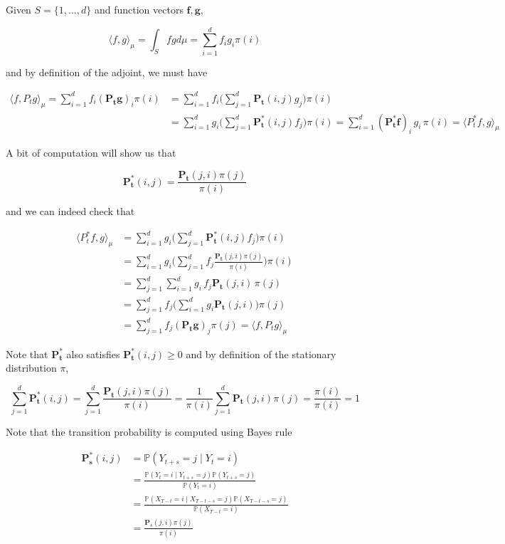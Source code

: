 \documentclass{article}
\begin{document}
      \begin{example}
      Given $S = \{1, \ldots, d\}$ and function vectors $\mathbf{f}, \mathbf{g}$, 

        \[\langle f, g \rangle_\mu = \int_S f g d\mu = \sum_{i=1}^d f_i g_i \pi(i)\]

      and by definition of the adjoint, we must have 

      \begin{align*}
        \langle f, P_t g \rangle_\mu = \sum_{i=1}^d f_i (\mathbf{P_t} \mathbf{g})_i \pi(i) & = \sum_{i=1}^d f_i \bigg( \sum_{j=1}^d \mathbf{P_t}(i, j) g_j \bigg) \pi(i) \\
        & = \sum_{i=1}^d g_i \bigg( \sum_{j=1}^d \mathbf{P_t^*} (i, j) f_j \bigg) \pi(i) = \sum_{i=1}^d (\mathbf{P_t^*} \mathbf{f})_i \, g_i \, \pi(i) = \langle P_t^* f, g \rangle_\mu 
      \end{align*}

      A bit of computation will show us that 

        \[\mathbf{P_t^*}(i, j) = \frac{\mathbf{P_t}(j, i) \pi(j)}{\pi(i)}\]

      and we can indeed check that 

      \begin{align*}
        \langle P_t^* f, g \rangle_\mu  & = \sum_{i=1}^d g_i \bigg( \sum_{j=1}^d \mathbf{P_t^*} (i, j) f_j \bigg) \pi(i) \\
        & = \sum_{i=1}^d g_i \bigg( \sum_{j=1}^d f_j \frac{\mathbf{P_t}(j, i) \pi(j)}{\pi(i)} \bigg) \pi(i) \\
        & = \sum_{j=1}^d \sum_{i=1}^d g_i \, f_j \mathbf{P_t}(j, i) \, \pi(j) \\
        & = \sum_{j=1}^d f_j \bigg( \sum_{i=1}^d g_i \mathbf{P_t}(j, i) \bigg) \pi(j) \\
        & = \sum_{j=1}^d f_j (\mathbf{P_t} \mathbf{g})_j \pi(j) = \langle f, P_t g \rangle_\mu
      \end{align*}

      Note that $\mathbf{P_t^*}$ also satisfies $\mathbf{P_t^*} (i, j) \geq 0$ and by definition of the stationary distribution $\pi$, 

        \[\sum_{j=1}^d \mathbf{P_t^*} (i, j) = \sum_{j=1}^d \frac{\mathbf{P_t}(j, i) \pi(j)}{\pi(i)} = \frac{1}{\pi(i)} \sum_{j=1}^d \mathbf{P_t}(j, i) \pi(j) = \frac{\pi(i)}{\pi(i)} = 1 \]

      Note that the transition probability is computed using Bayes rule 

      \begin{align*}
        \mathbf{P_s^*}(i, j) & = \mathbb{P}(Y_{t + s} = j \mid Y_t = i) \\
        & = \frac{\mathbb{P}(Y_t = i \mid Y_{t + s} = j) \mathbb{P}(Y_{t + s} = j)}{\mathbb{P}(Y_t = i)} \\
        & = \frac{\mathbb{P}(X_{T - t} = i \mid X_{T - t - s} = j) \mathbb{P}(X_{T - t - s} = j)}{\mathbb{P}(X_{T - t} = i)} \\
        & = \frac{\mathbf{P}_s (j, i) \pi(j)}{\pi(i)}
      \end{align*}
      \end{example}
\end{document}
